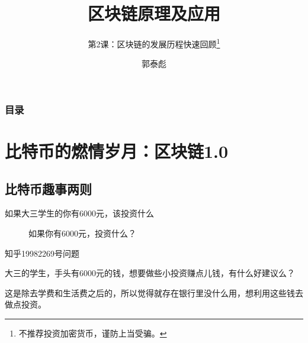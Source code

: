 \documentclass[11pt]{beamer}
\begin{document}
\author{郭泰彪}
\title{区块链原理及应用}
\subtitle{第2课：区块链的发展历程快速回顾\footnote{不推荐投资加密货币，谨防上当受骗。}}

\begin{frame}[plain]
	\maketitle
\end{frame}

\begin{frame}[shrink]
	\frametitle{目录}
	\tableofcontents[sectionstyle=show,subsectionstyle=show/shaded]
\end{frame}

\section{比特币的燃情岁月：区块链1.0}

\subsection{比特币趣事两则}
\begin{frame}{如果大三学生的你有6000元，该投资什么}
	\begin{figure}
		\centering
		{\Huge 如果你有6000元，投资什么？}
	\end{figure}
\end{frame}

\begin{frame}{知乎19982269号问题}

	大三的学生，手头有6000元的钱，想要做些小投资赚点儿钱，有什么好建议么？

	\footnotesize{这是除去学费和生活费之后的，所以觉得就存在银行里没什么用，想利用这些钱去做点投资。}
\end{frame}
\end{document}
